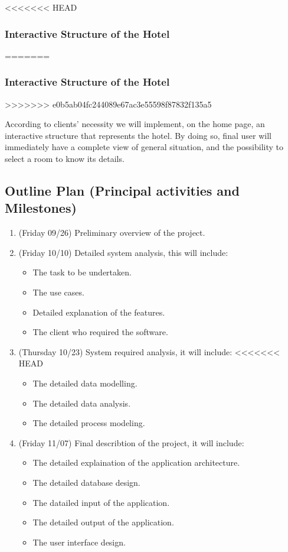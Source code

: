 <<<<<<< HEAD
\subsubsection{Interactive Structure of the Hotel}
=======
 \subsubsection{Interactive Structure of the Hotel}
>>>>>>> e0b5ab04fc244089e67ac3e55598f87832f135a5
	
According to clients’ necessity we will implement, on the home page, an interactive structure that represents the hotel. 
By doing so, final user will immediately have a complete view of general situation, and the possibility to select a room to know its details.

\subsection{Outline Plan (Principal activities and Milestones)}

\begin{enumerate}

\item (Friday 09/26) Preliminary overview of the project.

\item (Friday 10/10) Detailed system analysis, this will include:
	\begin{itemize}
		\item The task to be undertaken.
		\item The use cases.
		\item Detailed explanation of the features.
		\item The client who required the software.
	\end{itemize}

\item (Thursday 10/23) System required analysis, it will include:
<<<<<<< HEAD
  \begin{itemize}
    \item The detailed data modelling.
    \item The detailed data analysis.
    \item The detailed process modeling. 
  \end{itemize}

\item (Friday 11/07) Final describtion of the project, it will include:
  \begin{itemize}
    \item The detailed explaination of the application architecture.
    \item The detailed database design.
    \item The datailed input of the application.
    \item The detailed output of the application.
    \item The user interface design.
\end{itemize}

\end{enumerate}

